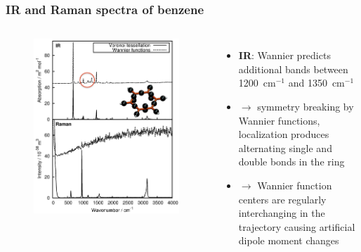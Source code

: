 \documentclass[t]{beamer}
\begin{document}
	\begin{frame}
	    \frametitle{IR and Raman spectra of benzene}
	    \vspace{-.6cm}
	    \begin{columns}
	    \begin{figure}
	    \vspace{-.6cm}
            \includegraphics[width=1.1\textwidth]{figures/benzene_spectra2.png}
        \end{figure}
        \begin{itemize}
            \item \textbf{IR}: Wannier predicts additional bands between 1200~cm$^{-1}$ and 1350~cm$^{-1}$ 
            \item[]
            $\rightarrow$ symmetry breaking by Wannier functions, localization produces alternating single and double bonds in the ring
            \item[]
            $\rightarrow$ Wannier function centers are regularly interchanging in the trajectory causing artificial dipole moment changes
        \end{itemize}

\end{columns}
\end{frame}
\end{document}
